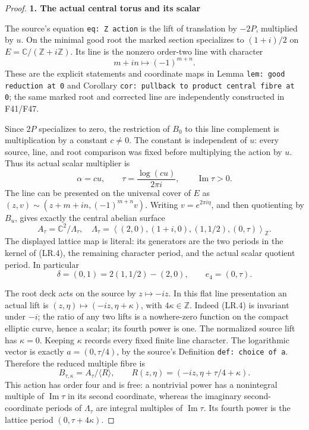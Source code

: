 \begin{proof}
\par

\medskip\noindent\textbf{1. The actual central torus and its scalar}

\par\nobreak

The source's equation \texttt{eq: Z action} is the lift of translation by
\(-2P\), multiplied by \(u\). On the minimal good root the marked
section specializes to \((1+i)/2\) on
\(E=\mathbb C/(\mathbb Z+i\mathbb Z)\). Its line is the nonzero
order-two line with character
\[
                  m+in\longmapsto(-1)^{m+n}.          \tag{LR.4}
\]
These are the explicit statements and coordinate maps in Lemma
\texttt{lem: good reduction at 0} and Corollary
\texttt{cor: pullback to product central fibre at 0}; the same marked root
and corrected line are independently constructed in F41/F47.

Since \(2P\) specializes to zero, the restriction of \(B_0\) to
this line complement is multiplication by a constant \(c\ne0\).
The constant is independent of \(u\): every source, line, and root
comparison was fixed before multiplying the action by \(u\).
Thus its actual scalar multiplier is
\[
              \alpha=cu,\qquad
              \tau=\frac{\log(cu)}{2\pi i},
              \qquad\operatorname{Im}\tau>0.         \tag{LR.5}
\]
The line can be presented on the universal cover of \(E\) as
\((z,v)\sim(z+m+in,(-1)^{m+n}v)\). Writing
\(v=e^{2\pi i\eta}\), and then quotienting by \(B_u\), gives
exactly the central abelian surface
\[
 A_\tau=\mathbb C^2/\Lambda_\tau,
 \quad
 \Lambda_\tau=
 \left\langle
  (2,0),(1+i,0),(1,1/2),(0,\tau)
 \right\rangle_{\mathbb Z}.                           \tag{LR.6}
\]
The displayed lattice map is literal: its generators are the two
periods in the kernel of (LR.4), the remaining character period,
and the actual scalar quotient period. In particular
\[
 \delta=(0,1)=2(1,1/2)-(2,0),\qquad e_4=(0,\tau).
\]

The root deck acts on the source by \(z\mapsto-iz\). In this flat
line presentation an actual lift is
\((z,\eta)\mapsto(-iz,\eta+\kappa)\), with
\(4\kappa\in\mathbb Z\). Indeed (LR.4) is invariant under
\(-i\); the ratio of any two lifts is a nowhere-zero function on
the compact elliptic curve, hence a scalar; its fourth power is one.
The normalized source lift has \(\kappa=0\). Keeping \(\kappa\)
records every fixed finite line character. The logarithmic vector
is exactly \(a=(0,\tau/4)\), by the source's Definition
\texttt{def: choice of a}. Therefore the reduced multiple fibre is
\[
 B_{\tau,\kappa}=A_\tau/\langle R\rangle,
 \qquad R(z,\eta)=(-iz,\eta+\tau/4+\kappa).           \tag{LR.7}
\]
This action has order four and is free: a nontrivial power has a
nonintegral multiple of \(\operatorname{Im}\tau\) in its second
coordinate, whereas the imaginary second-coordinate periods of
\(\Lambda_\tau\) are integral multiples of
\(\operatorname{Im}\tau\). Its fourth power is the lattice period
\((0,\tau+4\kappa)\).


\end{proof}

